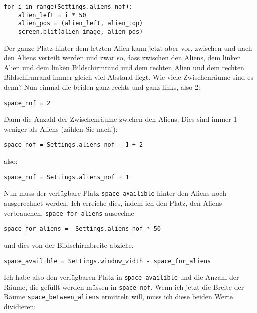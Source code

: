 \lstset{firstnumber=45}
\begin{lstlisting}
for i in range(Settings.aliens_nof):
    alien_left = i * 50
    alien_pos = (alien_left, alien_top)
    screen.blit(alien_image, alien_pos)
\end{lstlisting}




Der ganze Platz hinter dem letzten Alien kann jetzt aber vor, zwischen und nach den Aliens verteilt werden und zwar so, dass zwischen den Aliens, dem linken Alien und dem linken Bildschirmrand und dem rechten Alien und dem rechten Bildschirmrand immer gleich viel Abstand liegt. Wie viele Zwischenräume sind es denn? Nun einmal die beiden ganz rechts und ganz links, also 2:

\lstset{firstnumber=31}
\begin{lstlisting}
space_nof = 2  
\end{lstlisting}

Dann die Anzahl der Zwischenräume zwichen den Aliens. Dies sind immer 1 weniger als Aliens (zählen Sie nach!):

\lstset{firstnumber=31}
\begin{lstlisting}
space_nof = Settings.aliens_nof - 1 + 2
\end{lstlisting}

also:

\lstset{firstnumber=31}
\begin{lstlisting}
space_nof = Settings.aliens_nof + 1     
\end{lstlisting}

Nun muss der verfügbare Platz \texttt{space\_availible} hinter den Aliens noch ausgerechnet werden. Ich erreiche dies, indem ich den Platz, den Aliens verbrauchen, \texttt{space\_for\_aliens} ausrechne

\lstset{firstnumber=29}
\begin{lstlisting}
space_for_aliens =  Settings.aliens_nof * 50     
\end{lstlisting}

und dies von der Bildschirmbreite abziehe.
\lstset{firstnumber=30}
\begin{lstlisting}
space_availible = Settings.window_width - space_for_aliens
\end{lstlisting}

Ich habe also den verfügbaren Platz in \texttt{space\_availible} und die Anzahl der Räume, die gefüllt werden müssen in \texttt{space\_nof}. Wenn ich jetzt die Breite der Räume \texttt{space\_between\_\-aliens} ermitteln will, muss ich diese beiden Werte dividieren:

